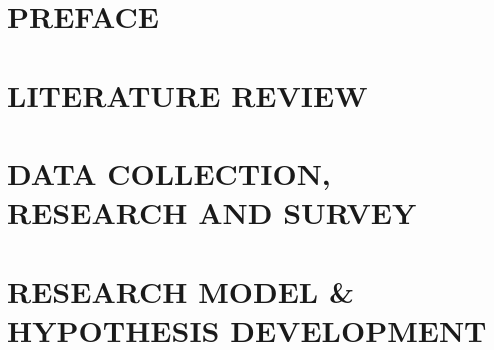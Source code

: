 \documentclass[a4paper,13pt,twoside]{extreport}
\theoremstyle{definition}
\begin{document}
\renewcommand{\listtablename}{LIST OF TABLES}
{\let\oldnumberline\numberline
	\renewcommand{\numberline}{Table~\oldnumberline}
	\listoftables}

\glsaddall
\renewcommand*{\acronymname}{LIST OF ABBREVIATIONS}
\renewcommand*{\entryname}{Abriviation}
\renewcommand*{\descriptionname}{Full Expression}


% 


\newpage
{}

\pagestyle{fancy}
\fancyhf{}
\fancyhead[RE, LO]{\leftmark}
\fancyfoot[RE, LO]{\thepage}

\chapter{PREFACE}
\label{chapter:Preface}


\newpage
\pagestyle{fancy}
\chapter{LITERATURE REVIEW}
\label{chapter:Literature_review}


\newpage
\pagestyle{fancy}
\chapter{DATA COLLECTION, RESEARCH AND SURVEY}
\label{chapter:Data_collection_research_and_survey}


\newpage
\pagestyle{fancy}
\chapter{RESEARCH MODEL \& HYPOTHESIS DEVELOPMENT}
\label{chapter:Research_model_and_hypothesis_development}


% 
\end{document}
